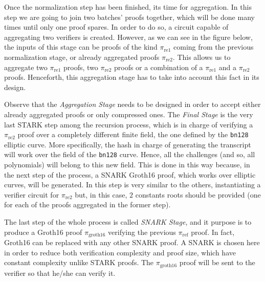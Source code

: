 Once the normalization step has been finished, its time for aggregation. In this step we are going to join two batches' proofs together, which will be done many times until only one proof spares. In order to do so, a circuit capable of aggregating two verifiers is created. However, as we can see in the figure below, the inputs of this stage can be proofs of the kind $\pi_{\text{re1}}$ coming from the previous normalization stage, or  already aggregated proofs $\pi_{\text{re2}}$. This allows us to aggregate two $\pi_{\text{re1}}$ proofs, two $\pi_{\text{re2}}$ proofs or a combination of a $\pi_{\text{re1}}$ and a $\pi_{\text{re2}}$ proofs. Henceforth, this aggregation stage has to take into account this fact in its design. 


Observe that the \textit{Aggregation Stage} needs to be designed in order to accept either already aggregated proofs or only compressed ones. 
The \textit{Final Stage} is the very last STARK step among the recursion process, which is in charge of verifying a $\pi_{\text{re2}}$ proof over a completely different finite field, the one defined by the \texttt{bn128} elliptic curve. More specifically, the hash in charge of generating the transcript will work over the field of the \texttt{bn128} curve. Hence, all the challenges (and so, all polynomials) will belong to this new field. This is done in this way because, in the next step of the process, a SNARK Groth16 proof, which works over elliptic curves, will be generated. In this step is very similar to the others, instantiating a verifier circuit for $\pi_{\text{re2}}$ but, in this case, $2$ constants roots should be provided (one for each of the proofs aggregated in the former step). 



The last step of the whole process is called \textit{SNARK Stage}, and it purpose is to produce a Groth16 proof $\pi_{\text{groth16}}$ verifying the previous $\pi_{\text{ref}}$ proof. In fact, Groth16 can be replaced with any other SNARK proof. A SNARK is chosen here in order to reduce both verification complexity and proof size, which have constant complexity unlike STARK proofs. The $\pi_{\text{groth16}}$ proof will be sent to the verifier so that he/she can verify it. 


